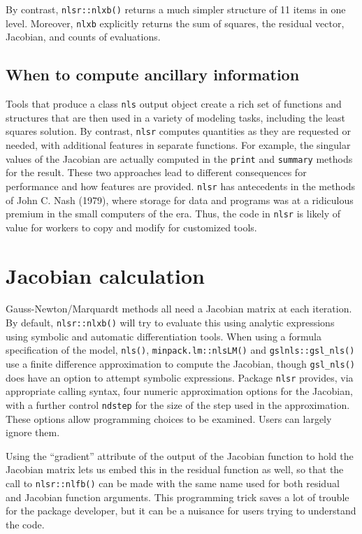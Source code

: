 By contrast, \texttt{nlsr::nlxb()} returns a much simpler structure of 11 items
in one level. Moreover, \texttt{nlxb} explicitly returns the sum of squares, the residual vector, Jacobian, and counts of evaluations.

\hypertarget{when-to-compute-ancillary-information}{%
\subsection{When to compute ancillary information}\label{when-to-compute-ancillary-information}}

Tools that produce a class \texttt{nls} output object create a rich set of functions
and structures that are then used in a variety of modeling tasks, including the
least squares solution. By contrast,
\texttt{nlsr} computes quantities as they are requested or needed, with additional
features in separate functions. For example, the singular values of the Jacobian
are actually computed in the \texttt{print} and \texttt{summary} methods for the result.
These two approaches
lead to different consequences for performance and how features are
provided. \texttt{nlsr} has antecedents in the methods of John C. Nash (1979), where storage for
data and programs was at a ridiculous premium in the small computers of the era.
Thus, the code in \texttt{nlsr} is likely of value for workers to copy and modify
for customized tools.

\hypertarget{jacobian-calculation}{%
\section{Jacobian calculation}\label{jacobian-calculation}}

Gauss-Newton/Marquardt methods all need a Jacobian matrix at each iteration.
By default, \texttt{nlsr::nlxb()} will try to evaluate this using analytic
expressions using symbolic and automatic differentiation tools.
When using a formula specification of the model, \texttt{nls()}, \texttt{minpack.lm::nlsLM()}
and \texttt{gslnls::gsl\_nls()} use a finite difference approximation to compute the
Jacobian, though \texttt{gsl\_nls()} does have an option to attempt symbolic expressions.
Package \texttt{nlsr} provides, via appropriate calling syntax, four numeric approximation
options for the Jacobian, with a further control \texttt{ndstep} for the size of the
step used in the approximation. These options allow programming choices to be
examined. Users can largely ignore them.

Using the ``gradient'' attribute of the output of the Jacobian function to hold
the Jacobian matrix lets us embed this in the residual function as well,
so that the call to \texttt{nlsr::nlfb()} can be made with the same name used for
both residual and Jacobian function arguments. This programming trick saves a
lot of trouble for the package developer, but it can be a nuisance for users
trying to understand the code.

